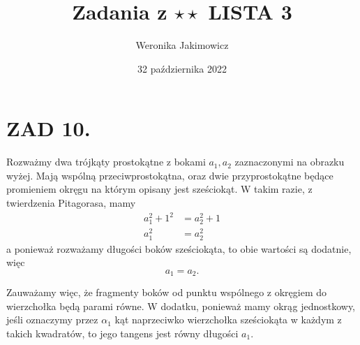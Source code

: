 \documentclass{article}[13pt]
\author{Weronika Jakimowicz}
\title{Zadania z $\star\star$ LISTA 3}
\date{32 października 2022}
\begin{document}
    \maketitle

    \section*{ZAD 10.}

    \begin{center}
    \end{center}

    Rozważmy dwa trójkąty prostokątne z bokami $a_1,a_2$ zaznaczonymi na obrazku wyżej. Mają wspólną przeciwprostokątna, oraz dwie przyprostokątne będące promieniem okręgu na którym opisany jest sześciokąt. W takim razie, z twierdzenia Pitagorasa, mamy
    \begin{align*}
        a_1^2+1^2&=a_2^2+1\\
        a_1^2&=a^2_2
    \end{align*}
    a ponieważ rozważamy długości boków sześciokąta, to obie wartości są dodatnie, więc
    $$a_1=a_2.$$

    Zauważamy więc, że fragmenty boków od punktu wspólnego z okręgiem do wierzchołka będą parami równe. W dodatku, ponieważ mamy okrąg jednostkowy, jeśli oznaczymy przez $\alpha_1$ kąt naprzeciwko wierzchołka sześciokąta w każdym z takich kwadratów, to jego tangens jest równy długości $a_1$.
\end{document}
